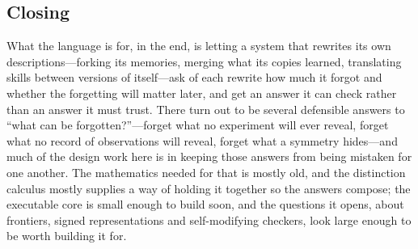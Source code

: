 \documentclass[11pt]{article}
\theoremstyle{definition}
\theoremstyle{plain}
\begin{document}
\subsection{Closing}

What the language is for, in the end, is letting a system that rewrites its own descriptions---forking
its memories, merging what its copies learned, translating skills between versions of itself---ask
of each rewrite how much it forgot and whether the forgetting will matter later, and get an answer it
can check rather than an answer it must trust. There turn out to be several defensible answers to
``what can be forgotten?''---forget what no experiment will ever reveal, forget what no record of
observations will reveal, forget what a symmetry hides---and much of the design work here is in
keeping those answers from being mistaken for one another. The mathematics needed for that is
mostly old, and the distinction calculus mostly supplies a way of holding it together so the answers
compose; the executable core is small enough to build soon, and the questions it opens, about
frontiers, signed representations and self-modifying checkers, look large enough to be worth
building it for.
\end{document}
